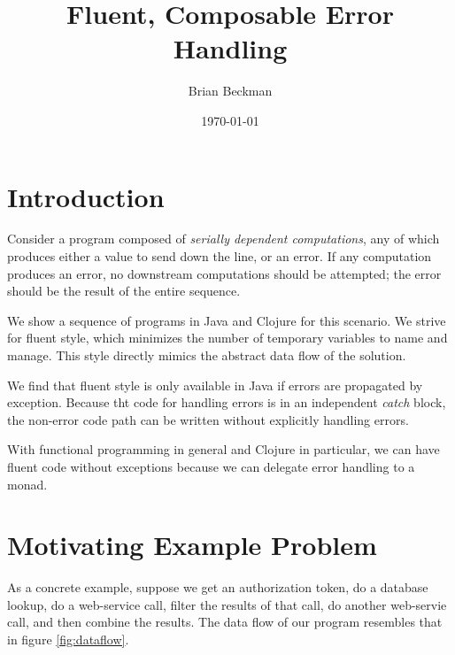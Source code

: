 \documentclass[11pt]{article}
\author{Brian Beckman}
\date{\today}
\title{Fluent, Composable Error Handling}
\begin{document}
\maketitle
\tableofcontents


\section{Introduction}
\label{sec-1}

Consider a program composed of \emph{serially dependent computations},
any of which produces either a value to send down the line, or an
error. If any computation produces an error, no downstream
computations should be attempted; the error should be the result of
the entire sequence.

We show a sequence of programs in Java and Clojure for this
scenario. We strive for fluent style, which minimizes the number of
temporary variables to name and manage. This style directly mimics
the abstract data flow of the solution.

We find that fluent style is only available in Java if errors are
propagated by exception. Because tht code for handling errors is in
an independent \emph{catch} block, the non-error code path can be written
without explicitly handling errors. 

With functional programming in general and Clojure in particular, we
can have fluent code without exceptions because we can delegate
error handling to a monad.
\section{Motivating Example Problem}
\label{sec-2}

As a concrete example, suppose we get an authorization token, do a
database lookup, do a web-service call, filter the results of that
call, do another web-servie call, and then combine the results. The
data flow of our program resembles that in figure
\ref{fig:dataflow}.
\end{document}
